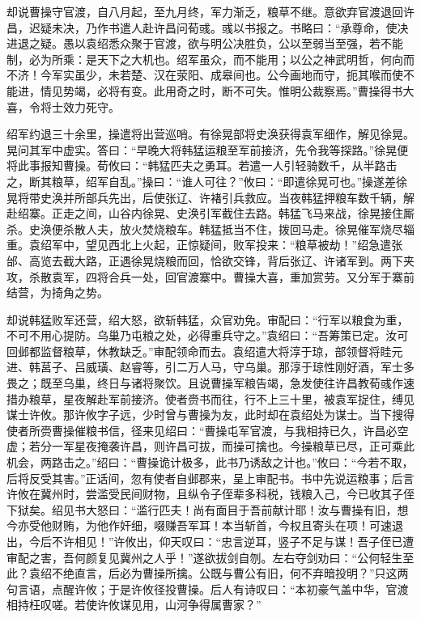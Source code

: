 却说曹操守官渡，自八月起，至九月终，军力渐乏，粮草不继。意欲弃官渡退回许昌，迟疑未决，乃作书遣人赴许昌问荀彧。彧以书报之。书略曰：“承尊命，使决进退之疑。愚以袁绍悉众聚于官渡，欲与明公决胜负，公以至弱当至强，若不能制，必为所乘：是天下之大机也。绍军虽众，而不能用；以公之神武明哲，何向而不济！今军实虽少，未若楚、汉在荥阳、成皋间也。公今画地而守，扼其喉而使不能进，情见势竭，必将有变。此用奇之时，断不可失。惟明公裁察焉。”曹操得书大喜，令将士效力死守。

绍军约退三十余里，操遣将出营巡哨。有徐晃部将史涣获得袁军细作，解见徐晃。晃问其军中虚实。答曰：“早晚大将韩猛运粮至军前接济，先令我等探路。”徐晃便将此事报知曹操。荀攸曰：“韩猛匹夫之勇耳。若遣一人引轻骑数千，从半路击之，断其粮草，绍军自乱。”操曰：“谁人可往？”攸曰：“即遣徐晃可也。”操遂差徐晃将带史涣并所部兵先出，后使张辽、许褚引兵救应。当夜韩猛押粮车数千辆，解赴绍寨。正走之间，山谷内徐晃、史涣引军截住去路。韩猛飞马来战，徐晃接住厮杀。史涣便杀散人夫，放火焚烧粮车。韩猛抵当不住，拨回马走。徐晃催军烧尽辎重。袁绍军中，望见西北上火起，正惊疑间，败军投来：“粮草被劫！”绍急遣张邰、高览去截大路，正遇徐晃烧粮而回，恰欲交锋，背后张辽、许诸军到。两下夹攻，杀散袁军，四将合兵一处，回官渡寨中。曹操大喜，重加赏劳。又分军于寨前结营，为掎角之势。

却说韩猛败军还营，绍大怒，欲斩韩猛，众官劝免。审配曰：“行军以粮食为重，不可不用心提防。乌巢乃屯粮之处，必得重兵守之。”袁绍曰：“吾筹策已定。汝可回邺都监督粮草，休教缺乏。”审配领命而去。袁绍遣大将淳于琼，部领督将眭元进、韩莒子、吕威璜、赵睿等，引二万人马，守乌巢。那淳于琼性刚好酒，军士多畏之；既至乌巢，终日与诸将聚饮。且说曹操军粮告竭，急发使往许昌教荀彧作速措办粮草，星夜解赴军前接济。使者赍书而往，行不上三十里，被袁军捉住，缚见谋士许攸。那许攸字子远，少时曾与曹操为友，此时却在袁绍处为谋士。当下搜得使者所赍曹操催粮书信，径来见绍曰：“曹操屯军官渡，与我相持已久，许昌必空虚；若分一军星夜掩袭许昌，则许昌可拔，而操可擒也。今操粮草已尽，正可乘此机会，两路击之。”绍曰：“曹操诡计极多，此书乃诱敌之计也。”攸曰：“今若不取，后将反受其害。”正话间，忽有使者自邺郡来，呈上审配书。书中先说运粮事；后言许攸在冀州时，尝滥受民间财物，且纵令子侄辈多科税，钱粮入己，今已收其子侄下狱矣。绍见书大怒曰：“滥行匹夫！尚有面目于吾前献计耶！汝与曹操有旧，想今亦受他财贿，为他作奸细，啜赚吾军耳！本当斩首，今权且寄头在项！可速退出，今后不许相见！”许攸出，仰天叹曰：“忠言逆耳，竖子不足与谋！吾子侄已遭审配之害，吾何颜复见冀州之人乎！”遂欲拔剑自刎。左右夺剑劝曰：“公何轻生至此？袁绍不绝直言，后必为曹操所擒。公既与曹公有旧，何不弃暗投明？”只这两句言语，点醒许攸；于是许攸径投曹操。后人有诗叹曰：“本初豪气盖中华，官渡相持枉叹嗟。若使许攸谋见用，山河争得属曹家？”

